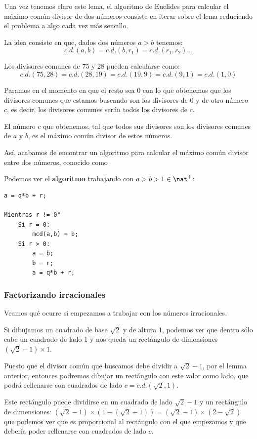 \documentclass{apuntes}
\begin{document}
Una vez tenemos claro este lema, el algoritmo de Euclides para calcular el máximo común divisor de dos números consiste en iterar sobre el lema reduciendo el problema a algo cada vez más sencillo.

La idea consiste en que, dados dos números $a>b$ tenemos:
\[c.d.(a,b)=c.d.(b,r_1)=c.d.(r_1,r_2)...\]
\begin{example}
Los divisores comunes de 75 y 28 pueden calcularse como:
\[c.d.(75,28)=c.d.(28,19) = c.d.(19,9)=c.d.(9,1) = c.d.(1,0)\]

Paramos en el momento en que el resto sea 0 con lo que obtenemos que los divisores comunes que estamos buscando son los divisores de 0 y de otro número $c$, es decir, los divisores comunes serán todos los divisores de $c$.
\end{example}

\obs El número $c$ que obtenemos, tal que todos sus divisores son los divisores comunes de $a$ y $b$, es el máximo común divisor de estos números.

Así, acabamos de encontrar un algoritmo para calcular el máximo común divisor entre dos números, conocido como 

Podemos ver el \textbf{algoritmo} trabajando con $a>b>1 \in \nat^+$:
\begin{verbatim}
a = q*b + r;

Mientras r != 0"
    Si r = 0:
        mcd(a,b) = b;
    Si r > 0:
        a = b;
        b = r;
        a = q*b + r;
\end{verbatim}

\subsubsection{Factorizando irracionales}

Veamos qué ocurre si empezamos a trabajar con los números irracionales.

Si dibujamos un cuadrado de base $\sqrt{2}$ y de altura 1, podemos ver que dentro sólo cabe un cuadrado de lado 1 y nos queda un rectángulo de dimensiones $(\sqrt{2}-1)\times 1$.

Puesto que el divisor común que buscamos debe dividir a $\sqrt{2}-1$, por el lemma anterior, entonces podremos dibujar un rectángulo con este valor como lado, que podrá rellenarse con cuadrados de lado $c = c.d.(\sqrt{2},1)$.

Este rectángulo puede dividirse en un cuadrado de lado $\sqrt{2}-1$ y un rectángulo de dimensiones: $(\sqrt{2}-1) \times (1-(\sqrt{2}-1) ) = (\sqrt{2}-1) \times (2 - \sqrt{2})$ que podemos ver que es proporcional al rectángulo con el que empezamos y que debería poder rellenarse con cuadrados de lado $c$.
\end{document}

